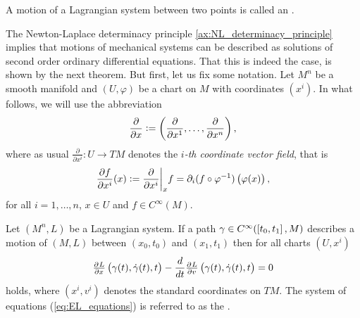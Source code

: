\begin{definition}[Extremal]
	A motion of a Lagrangian system between two points is called an .
\end{definition}

The Newton-Laplace determinacy principle \ref{ax:NL_determinacy_principle} implies that motions of mechanical systems can be described as solutions of second order ordinary differential equations. That this is indeed the case, is shown by the next theorem. But first, let us fix some notation. Let $M^n$ be a smooth manifold and $(U,\varphi)$ be a chart on $M$ with coordinates $(x^i)$. In what follows, we will use the abbreviation
\begin{equation*}
	\frac{\partial}{\partial x} := \del[3]{\frac{\partial}{\partial x^1},\dots,\frac{\partial}{\partial x^n}},
\end{equation*}
\noindent where as usual $\frac{\partial}{\partial x^i} : U \to TM$ denotes the \emph{$i$-th coordinate vector field}, that is
\begin{equation*}
	\frac{\partial f}{\partial x^i}(x) := \frac{\partial}{\partial x^i}\bigg\vert_x f = \partial_i(f \circ \varphi^{-1})\del[1]{\varphi(x)},
\end{equation*}
\noindent for all $i = 1,\dots,n$, $x \in U$ and $f \in C^\infty(M)$.

\begin{theorem}
	\label{thm:EL_equations}
	Let $(M^n,L)$ be a Lagrangian system. If a path $\gamma \in C^\infty(\intcc[0]{t_0,t_1},M)$ describes a motion of $(M,L)$ between $(x_0,t_0)$ and $(x_1,t_1)$ then for all charts $(U,x^i)$
	\begin{equation}
		\label{eq:EL_equations}
		\pd{L}{x}\del[1]{\gamma(t),\dot{\gamma}(t),t} - \frac{d}{dt} \pd{L}{v}\del[1]{\gamma(t),\dot{\gamma}(t),t} = 0
	\end{equation}
	\noindent holds, where $(x^i,v^i)$ denotes the standard coordinates on $TM$. The system of equations \textup{(}\ref{eq:EL_equations}\textup{)} is referred to as the .
\end{theorem}

